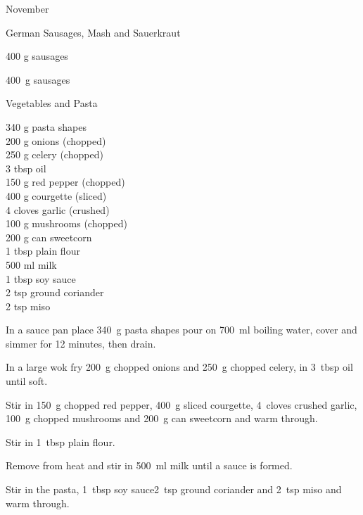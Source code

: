 \begin{menu}{November}
    \begin{recipe}{2}{German Sausages, Mash and Sauerkraut}%
		\begin{ingredients}
		400 g sausages  \\
	
		\end{ingredients}
	
	
    \begin{instructions}
    \item 400~g  sausages
    \end{instructions}
    \end{recipe}%
  
    \begin{recipe}{2}{Vegetables and Pasta}%
		\begin{ingredients}
		340 g pasta shapes  \\
	200 g onions (chopped) \\
	250 g celery (chopped) \\
	3 tbsp oil  \\
	150 g red pepper (chopped) \\
	400 g courgette (sliced) \\
	4 cloves garlic (crushed) \\
	100 g mushrooms (chopped) \\
	200 g can sweetcorn  \\
	1 tbsp plain flour  \\
	500 ml milk  \\
	1 tbsp soy sauce  \\
	2 tsp ground coriander  \\
	2 tsp miso  \\
	
		\end{ingredients}
	
	
    \begin{instructions}
    \item 
    In a
    sauce pan
    place
    340~g  pasta shapes
    pour on
    700~ml  boiling water,
    cover and simmer for 12 minutes, then drain.
  \item 
        In a large wok fry
        200~g chopped onions
        and
        250~g chopped celery,
        in
        3~tbsp  oil
        until soft.
      \item 
        Stir in
        150~g chopped red pepper,
        400~g sliced courgette,
        4~cloves crushed garlic,
        100~g chopped mushrooms
        and
        200~g  can sweetcorn
        and warm through.
      \item 
        Stir in
        1~tbsp  plain flour.
      \item 
        Remove from heat and stir in
        500~ml  milk
        until a sauce is formed.
      \item 
        Stir in
        the pasta,
        1~tbsp  soy sauce2~tsp  ground coriander
        and
        2~tsp  miso
        and warm through.
      

\end{instructions}
\end{recipe}
\end{menu}
